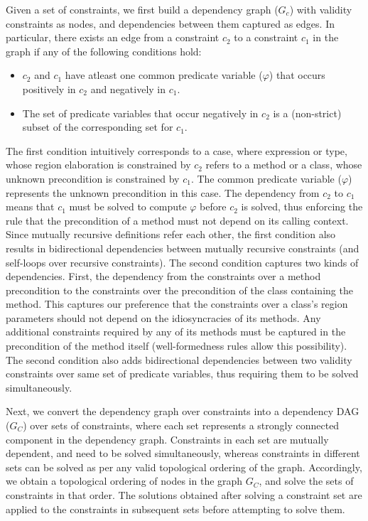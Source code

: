 Given a set of constraints, we first build a dependency graph ($G_c$)
with validity constraints as nodes, and dependencies between them
captured as edges. In particular, there exists an edge from a
constraint $c_2$ to a constraint $c_1$ in the graph if any of the
following conditions hold:
\begin{itemize}
\item $c_2$ and $c_1$ have atleast one common predicate variable
($\varphi$) that occurs positively in $c_2$ and negatively in $c_1$.
\item The set of predicate variables that occur negatively in $c_2$ is
a (non-strict) subset of the corresponding set for $c_1$.
\end{itemize}
The first condition intuitively corresponds to a case, where
expression or type, whose region elaboration is constrained by $c_2$
refers to a method or a class, whose unknown precondition is
constrained by $c_1$. The common predicate variable ($\varphi$)
represents the unknown precondition in this case. The dependency from
$c_2$ to $c_1$ means that $c_1$ must be solved to compute $\varphi$
before $c_2$ is solved, thus enforcing the rule that the precondition
of a method must not depend on its calling context. Since mutually
recursive definitions refer each other, the first condition also
results in bidirectional dependencies between mutually recursive
constraints (and self-loops over recursive constraints). The second
condition captures two kinds of dependencies. First, the dependency
from the constraints over a method precondition to the constraints
over the precondition of the class containing the method. This
captures our preference that the constraints over a class's region
parameters should not depend on the idiosyncracies of its methods. Any
additional constraints required by any of its methods must be captured
in the precondition of the method itself (well-formedness rules allow
this possibility). The second condition also adds bidirectional
dependencies between two validity constraints over same set of
predicate variables, thus requiring them to be solved simultaneously. 

Next, we convert the dependency graph over constraints into a
dependency DAG ($G_C$) over sets of constraints, where each set
represents a strongly connected component in the dependency graph.
Constraints in each set are mutually dependent, and need to be solved
simultaneously, whereas constraints in different sets can be solved as
per any valid topological ordering of the graph. Accordingly, we
obtain a topological ordering of nodes in the graph $G_{{C}}$, and
solve the sets of constraints in that order. The solutions obtained
after solving a constraint set are applied to the constraints in
subsequent sets before attempting to solve them. 

